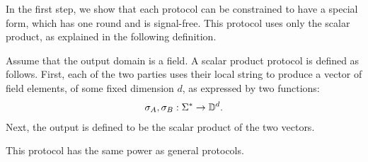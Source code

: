 In the first step, we show that each protocol can be constrained to have a special form, which has one round and is signal-free. This protocol uses only the scalar product,  as explained in the following definition. 
\begin{definition} \label{def:scalar-product-protocol}
    Assume that the output domain is a field.
    A scalar product protocol is defined as follows. First, each of the two parties uses their local string to  produce a vector of field elements, of some fixed dimension $d$, as expressed by two functions: 
    \begin{align*}
    \sigma_A, \sigma_B : \Sigma^* \to \mathbb D^d.
    \end{align*}
    Next, the output is defined to be the scalar product of the two vectors. 
\end{definition}

This protocol has the same power as general protocols. 

